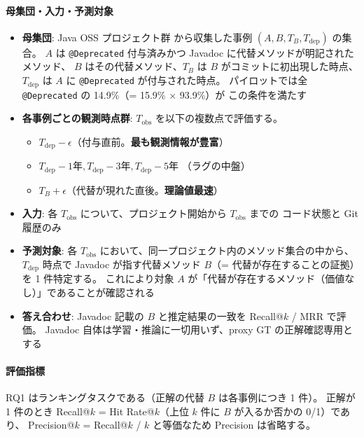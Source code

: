 \documentclass[a4paper,12pt]{article}
\begin{document}
\paragraph{母集団・入力・予測対象}
\begin{itemize}
  \item \textbf{母集団}: Java OSS プロジェクト群
        から収集した事例 $(A, B, T_B, T_{\text{dep}})$ の集合。
        $A$ は \texttt{@Deprecated} 付与済みかつ Javadoc に代替メソッドが明記されたメソッド、
        $B$ はその代替メソッド、$T_B$ は $B$ がコミットに初出現した時点、
        $T_{\text{dep}}$ は $A$ に \texttt{@Deprecated} が付与された時点。
        パイロットでは全 \texttt{@Deprecated} の 14.9\%（= 15.9\% $\times$ 93.9\%）が
        この条件を満たす
  \item \textbf{各事例ごとの観測時点群}: $T_{\text{obs}}$ を以下の複数点で評価する。
    \begin{itemize}
      \item $T_{\text{dep}} - \epsilon$（付与直前。\textbf{最も観測情報が豊富}）
      \item $T_{\text{dep}} - 1\text{年}, T_{\text{dep}} - 3\text{年}, T_{\text{dep}} - 5\text{年}$
            （ラグの中盤）
      \item $T_B + \epsilon$（代替が現れた直後。\textbf{理論値最速}）
    \end{itemize}
  \item \textbf{入力}: 各 $T_{\text{obs}}$ について、プロジェクト開始から $T_{\text{obs}}$ までの
        コード状態と Git 履歴のみ
  \item \textbf{予測対象}: 各 $T_{\text{obs}}$ において、同一プロジェクト内のメソッド集合の中から、
        $T_{\text{dep}}$ 時点で Javadoc が指す代替メソッド $B$（= 代替が存在することの証拠）を 1 件特定する。
        これにより対象 $A$ が「代替が存在するメソッド（価値なし）」であることが確認される
  \item \textbf{答え合わせ}: Javadoc 記載の $B$ と推定結果の一致を Recall@$k$ / MRR で評価。
        Javadoc 自体は学習・推論に一切用いず、proxy GT の正解確認専用とする
\end{itemize}

\paragraph{評価指標}

RQ1 はランキングタスクである（正解の代替 $B$ は各事例につき 1 件）。
正解が 1 件のとき Recall@$k$ = Hit Rate@$k$（上位 $k$ 件に $B$ が入るか否かの 0/1）であり、
Precision@$k$ = Recall@$k$ / $k$ と等価なため Precision は省略する。
\end{document}
